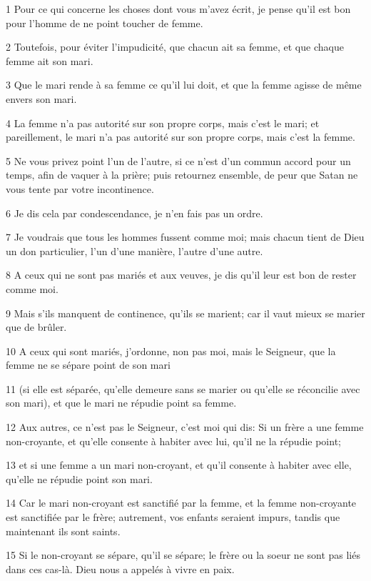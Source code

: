 \par 1 Pour ce qui concerne les choses dont vous m'avez écrit, je pense qu'il est bon pour l'homme de ne point toucher de femme.
\par 2 Toutefois, pour éviter l'impudicité, que chacun ait sa femme, et que chaque femme ait son mari.
\par 3 Que le mari rende à sa femme ce qu'il lui doit, et que la femme agisse de même envers son mari.
\par 4 La femme n'a pas autorité sur son propre corps, mais c'est le mari; et pareillement, le mari n'a pas autorité sur son propre corps, mais c'est la femme.
\par 5 Ne vous privez point l'un de l'autre, si ce n'est d'un commun accord pour un temps, afin de vaquer à la prière; puis retournez ensemble, de peur que Satan ne vous tente par votre incontinence.
\par 6 Je dis cela par condescendance, je n'en fais pas un ordre.
\par 7 Je voudrais que tous les hommes fussent comme moi; mais chacun tient de Dieu un don particulier, l'un d'une manière, l'autre d'une autre.
\par 8 A ceux qui ne sont pas mariés et aux veuves, je dis qu'il leur est bon de rester comme moi.
\par 9 Mais s'ils manquent de continence, qu'ils se marient; car il vaut mieux se marier que de brûler.
\par 10 A ceux qui sont mariés, j'ordonne, non pas moi, mais le Seigneur, que la femme ne se sépare point de son mari
\par 11 (si elle est séparée, qu'elle demeure sans se marier ou qu'elle se réconcilie avec son mari), et que le mari ne répudie point sa femme.
\par 12 Aux autres, ce n'est pas le Seigneur, c'est moi qui dis: Si un frère a une femme non-croyante, et qu'elle consente à habiter avec lui, qu'il ne la répudie point;
\par 13 et si une femme a un mari non-croyant, et qu'il consente à habiter avec elle, qu'elle ne répudie point son mari.
\par 14 Car le mari non-croyant est sanctifié par la femme, et la femme non-croyante est sanctifiée par le frère; autrement, vos enfants seraient impurs, tandis que maintenant ils sont saints.
\par 15 Si le non-croyant se sépare, qu'il se sépare; le frère ou la soeur ne sont pas liés dans ces cas-là. Dieu nous a appelés à vivre en paix.
